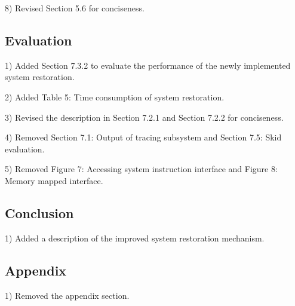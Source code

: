 \documentclass[journal,12pt,onecolumn,draftclsnofoot,]{IEEEtran}
\begin{document}
8) Revised Section 5.6 for conciseness.

\subsection{Evaluation}
1) Added Section 7.3.2 to evaluate the performance of the newly implemented
system restoration.

2) Added Table 5: Time consumption of system restoration.

3) Revised the description in Section 7.2.1 and Section 7.2.2 for conciseness.

4) Removed Section 7.1: Output of tracing subsystem and Section 7.5: Skid evaluation.

5) Removed Figure 7: Accessing system instruction interface and Figure 8: Memory
mapped interface.

\subsection{Conclusion}
1) Added a description of the improved system restoration mechanism.

\subsection{Appendix}
1) Removed the appendix section.



\end{document}
